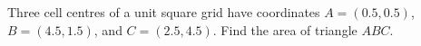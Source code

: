 Three cell centres of a unit square grid have coordinates $A=(0.5,0.5)$, $B=(4.5,1.5)$, and $C=(2.5,4.5)$. Find the area of triangle $ABC$.
